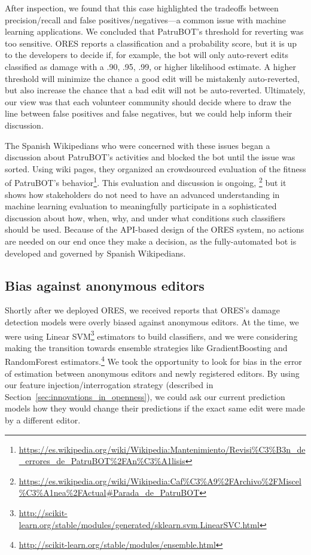 After inspection, we found that this case highlighted the tradeoffs between precision/recall and false positives/negatives---a common issue with machine learning applications. We concluded that PatruBOT's threshold for reverting was too sensitive. ORES reports a classification and a probability score, but it is up to the developers to decide if, for example, the bot will only auto-revert edits classified as damage with a .90, .95, .99, or higher likelihood estimate. A higher threshold will minimize the chance a good edit will be mistakenly auto-reverted, but also increase the chance that a bad edit will not be auto-reverted.  Ultimately, our view was that each volunteer community should decide where to draw the line between false positives and false negatives, but we could help inform their discussion.

The Spanish Wikipedians who were concerned with these issues began a discussion about PatruBOT's activities and blocked the bot until the issue was sorted. Using wiki pages, they organized an crowdsourced evaluation of the fitness of PatruBOT's behavior\footnote{\url{https://es.wikipedia.org/wiki/Wikipedia:Mantenimiento/Revisi\%C3\%B3n_de_errores_de_PatruBOT\%2FAn\%C3\%A1lisis}}.  This evaluation and discussion is ongoing, \footnote{\url{https://es.wikipedia.org/wiki/Wikipedia:Caf\%C3\%A9\%2FArchivo\%2FMiscel\%C3\%A1nea\%2FActual\#Parada_de_PatruBOT}} but it shows how stakeholders do not need to have an advanced understanding in machine learning evaluation to meaningfully participate in a sophisticated discussion about how, when, why, and under what conditions such classifiers should be used. Because of the API-based design of the ORES system, no actions are needed on our end once they make a decision, as the fully-automated bot is developed and governed by Spanish Wikipedians.

\subsection{Bias against anonymous editors}

Shortly after we deployed ORES, we received reports that ORES's damage detection models were overly biased against anonymous editors.  At the time, we were using Linear SVM\footnote{\url{http://scikit-learn.org/stable/modules/generated/sklearn.svm.LinearSVC.html}} estimators to build classifiers, and we were considering making the transition towards ensemble strategies like GradientBoosting and RandomForest estimators.\footnote{\url{http://scikit-learn.org/stable/modules/ensemble.html}}  We took the opportunity to look for bias in the error of estimation between anonymous editors and newly registered editors.  By using our feature injection/interrogation strategy (described in Section~\ref{sec:innovations_in_openness}), we could ask our current prediction models how they would change their predictions if the exact same edit were made by a different editor.

